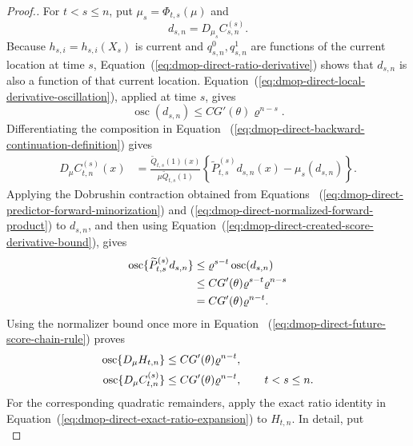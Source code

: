 \documentclass[11pt]{article}
\theoremstyle{thmstylethree}%
\begin{document}
\begin{proof}[Proof.]
For $t<s\leq n$, put $\mu_s=\Phi_{t,s}(\mu)$ and
\begin{equation}
d_{s,n}=D_{\mu_s}C_{s,n}^{(s)}.
\end{equation}
Because $h_{s,i}=h_{s,i}(X_s)$ is current and
$q_{s,n}^{0},q_{s,n}^{1}$ are functions of the current location at time
$s$, Equation~(\ref{eq:dmop-direct-ratio-derivative}) shows that
$d_{s,n}$ is also a function of that current location.
Equation~(\ref{eq:dmop-direct-local-derivative-oscillation}), applied at
time $s$, gives
\begin{equation}
\operatorname{osc}(d_{s,n})
\leq
CG'(\theta)\varrho^{n-s}.
\label{eq:dmop-direct-created-score-derivative-bound}
\end{equation}
Differentiating the composition in Equation~
(\ref{eq:dmop-direct-backward-continuation-definition}) gives
\begin{align}
D_\mu C_{t,n}^{(s)}(x)
&=
\frac{\widetilde Q_{t,s}(1)(x)}
{\mu\widetilde Q_{t,s}(1)}
\left\{
\widetilde P_{t,s}^{(s)}d_{s,n}(x)-\mu_s(d_{s,n})
\right\}.
\label{eq:dmop-direct-future-score-chain-rule}
\end{align}
Applying the Dobrushin contraction obtained from Equations~
(\ref{eq:dmop-direct-predictor-forward-minorization}) and
(\ref{eq:dmop-direct-normalized-forward-product}) to $d_{s,n}$, and then
using Equation~(\ref{eq:dmop-direct-created-score-derivative-bound}),
gives
\begin{align}
\operatorname{osc}\{\widetilde P_{t,s}^{(s)}d_{s,n}\}
&\leq
\varrho^{s-t}\operatorname{osc}(d_{s,n})                  \notag\\
&\leq
CG'(\theta)\varrho^{s-t}\varrho^{n-s}                    \notag\\
&=
CG'(\theta)\varrho^{n-t}.
\label{eq:dmop-direct-future-score-two-contractions}
\end{align}
Using the normalizer bound once more in Equation~
(\ref{eq:dmop-direct-future-score-chain-rule}) proves
\begin{align}
\operatorname{osc}\{D_\mu H_{t,n}\}
&\leq CG'(\theta)\varrho^{n-t},                             \notag\\
\operatorname{osc}\{D_\mu C_{t,n}^{(s)}\}
&\leq CG'(\theta)\varrho^{n-t},
\qquad t<s\leq n.
\label{eq:dmop-direct-future-current-derivative-bounds}
\end{align}
For the corresponding quadratic remainders, apply the exact ratio
identity in Equation~(\ref{eq:dmop-direct-exact-ratio-expansion}) to
$H_{t,n}$.  In detail, put
\begin{equation}

\end{equation}
\end{proof}
\end{document}
